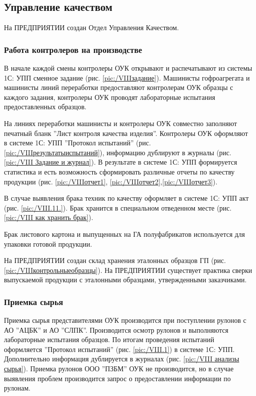 \subsection{Управление качеством}
\label{bp:quality}

На ПРЕДПРИЯТИИ создан Отдел Управления Качеством. 

\subsubsection{Работа контролеров на производстве} 

В начале каждой смены контролеры ОУК открывают и распечатывают из системы 1С: УПП сменное задание (рис. \ref{pic:/VIIIзадание}). Машинисты гофроагрегата и машинисты линий переработки предоставляют контролерам ОУК образцы с каждого задания, контролеры ОУК проводят лабораторные испытания предоставленных образцов. 

На линиях переработки машинисты и контролеры ОУК совместно заполняют печатный бланк ''Лист контроля качества изделия''. Контролеры ОУК оформляют в системе 1С: УПП ''Протокол испытаний'' (рис. \ref{pic:/VIIIрезультатыиспытаний}), информацию дублируют в журналы (рис. \ref{pic:/VIII Задание и журнал}). В результате в системе 1С: УПП формируется статистика и есть возможность сформировать различные отчеты по качеству продукции (рис. \ref{pic:/VIIIотчет1}, \ref{pic:/VIIIотчет2},\ref{pic:/VIIIотчет3}).  

В случае выявления брака техник по качеству оформляет в системе 1С: УПП акт (рис. \ref{pic:/VIII.11.}). Брак хранится в специальном отведенном месте (рис. \ref{pic:/VIII как хранить брак}).

Брак листового картона и выпущенных на ГА полуфабрикатов  используется для упаковки готовой продукции. 

На ПРЕДПРИЯТИИ создан склад хранения эталонных образцов ГП (рис. \ref{pic:/VIIIконтрольныеобразцы}). На ПРЕДПРИЯТИИ существует практика сверки выпускаемой продукции с эталонными образцами, утвержденными заказчиками.


\subsubsection{Приемка сырья} 

Приемка сырья представителями ОУК производится при поступлении рулонов с АО ''АЦБК'' и АО ''СЛПК''. Производится осмотр рулонов и выполняются лабораторные испытания образцов. По итогам проведения испытаний оформляется ''Протокол испытаний'' (рис. \ref{pic:/VIII.1}) в системе 1С: УПП. Дополнительно информация дублируется в журналах (рис. \ref{pic:/VIII анализы сырья}).
Приемка рулонов ООО ''ПЗБМ'' ОУК не производится, но в случае выявления проблем производится запрос  о предоставлении информации по рулонам. 


